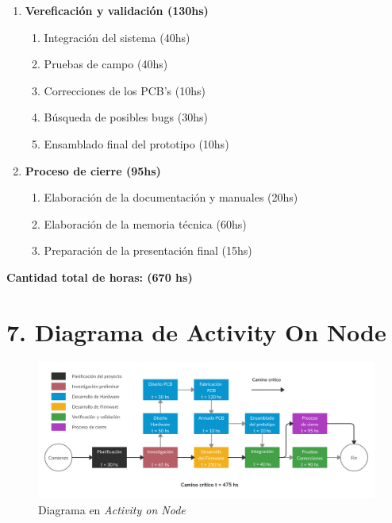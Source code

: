 \documentclass[11pt]{charter}
\begin{document}
\begin{enumerate}
	\item \textbf{Vereficación y validación (130hs)}
	\begin{enumerate}[label*=\arabic*.]
		\item Integración del sistema (40hs)
		\item Pruebas de campo (40hs)
		\item Correcciones de los PCB's (10hs)	
		\item Búsqueda de posibles bugs  (30hs)
		\item Ensamblado final del prototipo (10hs)  
	\end{enumerate}	
	
	\item \textbf{Proceso de cierre (95hs)}
	\begin{enumerate}[label*=\arabic*.]
		\item Elaboración de la documentación y manuales (20hs)
		\item Elaboración de la memoria técnica (60hs)
		\item Preparación de la presentación final (15hs)	 
	\end{enumerate}		
\end{enumerate}

\textbf{Cantidad total de horas: (670 hs)}


\section{7. Diagrama de Activity On Node}
\label{sec:AoN}





\begin{figure}[htpb]
\centering 
\includegraphics[width=1\textwidth]{./Figuras/AoN_Cargador.png}
\caption{Diagrama en \textit{Activity on Node}}
\label{fig:AoN}
\end{figure}
\end{document}
